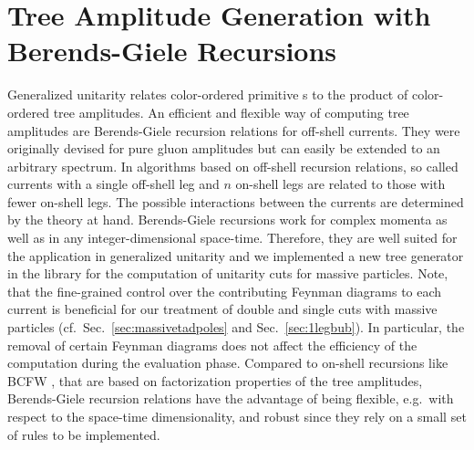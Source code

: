 \section{Tree Amplitude Generation with Berends-Giele Recursions}
\label{sec:BGrec}
Generalized unitarity relates color-ordered primitive \ola s to the
product of color-ordered tree
amplitudes. An efficient and flexible way of computing tree amplitudes are
Berends-Giele recursion relations \cite{Berends:1987me} for off-shell
currents. They were originally
devised for pure gluon amplitudes but can easily be extended to an
arbitrary spectrum. In algorithms based on off-shell recursion
relations, so called currents with a single off-shell leg and $n$ on-shell legs
are related to those with fewer on-shell legs. The possible
interactions between the currents are determined by the
theory at hand. Berends-Giele recursions work for complex
momenta as well as in any integer-dimensional space-time. Therefore, they are well suited for the
application in generalized unitarity and we implemented a new tree
generator in the \BlackHat{} library for the computation of unitarity
cuts for massive particles. Note, that
the fine-grained control over the contributing Feynman diagrams to each
current is beneficial for our treatment of double and single cuts with
massive particles (cf.~Sec.~\ref{sec:massivetadpoles} and
Sec.~\ref{sec:1legbub}). In particular, the removal of certain Feynman
diagrams does not affect the
efficiency of the computation during the evaluation phase. Compared to on-shell recursions like BCFW
\cite{Britto2005c,Britto2005f}, that are based on factorization
properties of the tree amplitudes, Berends-Giele recursion relations have the
advantage of being flexible, e.g.\ with respect to the space-time
dimensionality, and robust since they rely on a small set of rules to be
implemented.

